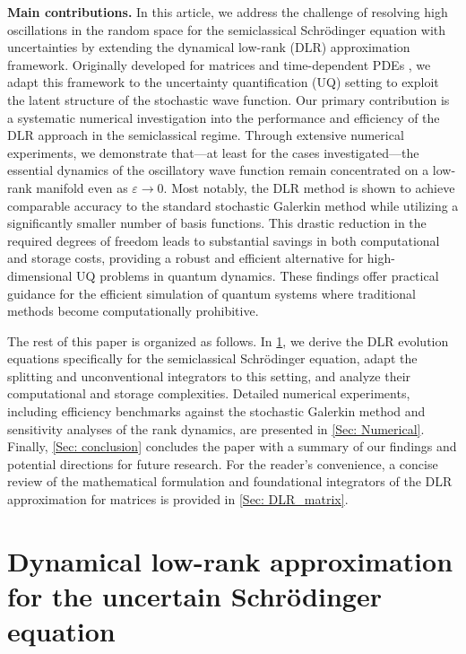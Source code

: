 \documentclass[preprint,11pt]{elsarticle}
\begin{document}
\textbf{Main contributions.} In this article, we address the challenge of resolving high oscillations in the random space for the semiclassical Schrödinger equation with uncertainties by extending the dynamical low-rank (DLR) approximation framework. Originally developed for matrices \cite{kochDynamicalLowRankApproximation2007} and time-dependent PDEs \cite{einkemmerLowrankProjectorsplittingIntegrator2020}, we adapt this framework to the uncertainty quantification (UQ) setting to exploit the latent structure of the stochastic wave function. Our primary contribution is a systematic numerical investigation into the performance and efficiency of the DLR approach in the semiclassical regime. Through extensive numerical experiments, we demonstrate that—at least for the cases investigated—the essential dynamics of the oscillatory wave function remain concentrated on a low-rank manifold even as $\varepsilon \to 0$. Most notably, the DLR method is shown to achieve comparable accuracy to the standard stochastic Galerkin method while utilizing a significantly smaller number of basis functions. This drastic reduction in the required degrees of freedom leads to substantial savings in both computational and storage costs, providing a robust and efficient alternative for high-dimensional UQ problems in quantum dynamics. These findings offer practical guidance for the efficient simulation of quantum systems where traditional methods become computationally prohibitive.

The rest of this paper is organized as follows. In \cref{Sec: DLR_Schrodinger}, we derive the DLR evolution equations specifically for the semiclassical Schrödinger equation, adapt the splitting and unconventional integrators to this setting, and analyze their computational and storage complexities. Detailed numerical experiments, including efficiency benchmarks against the stochastic Galerkin method and sensitivity analyses of the rank dynamics, are presented in \cref{Sec: Numerical}. Finally, \cref{Sec: conclusion} concludes the paper with a summary of our findings and potential directions for future research. For the reader's convenience, a concise review of the mathematical formulation and foundational integrators of the DLR approximation for matrices is provided in \ref{Sec: DLR_matrix}.

%
    \section{Dynamical low-rank approximation for the uncertain Schr\"odinger equation}
\label{Sec: DLR_Schrodinger}
\end{document}
